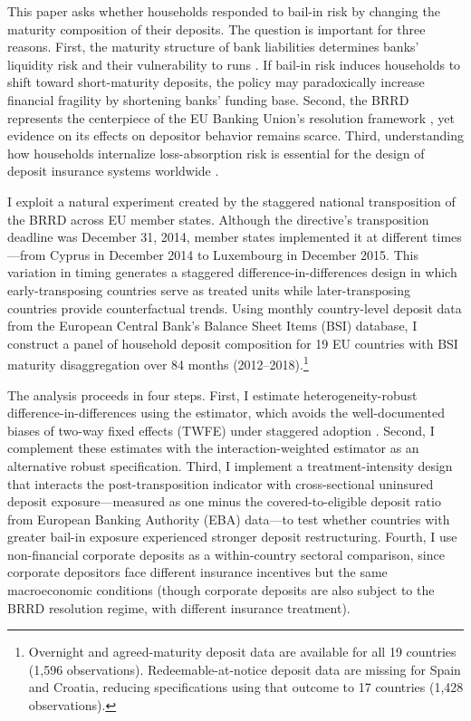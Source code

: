 \documentclass[12pt]{article}
\begin{document}
This paper asks whether households responded to bail-in risk by changing the maturity composition of their deposits. The question is important for three reasons. First, the maturity structure of bank liabilities determines banks' liquidity risk and their vulnerability to runs \citep{diamond1983bank, kashyap2002banks}. If bail-in risk induces households to shift toward short-maturity deposits, the policy may paradoxically increase financial fragility by shortening banks' funding base. Second, the BRRD represents the centerpiece of the EU Banking Union's resolution framework \citep{veron2015europe}, yet evidence on its effects on depositor behavior remains scarce. Third, understanding how households internalize loss-absorption risk is essential for the design of deposit insurance systems worldwide \citep{demirguc2004deposit}.

I exploit a natural experiment created by the staggered national transposition of the BRRD across EU member states. Although the directive's transposition deadline was December 31, 2014, member states implemented it at different times---from Cyprus in December 2014 to Luxembourg in December 2015. This variation in timing generates a staggered difference-in-differences design in which early-transposing countries serve as treated units while later-transposing countries provide counterfactual trends. Using monthly country-level deposit data from the European Central Bank's Balance Sheet Items (BSI) database, I construct a panel of household deposit composition for 19 EU countries with BSI maturity disaggregation over 84 months (2012--2018).\footnote{Overnight and agreed-maturity deposit data are available for all 19 countries (1,596 observations). Redeemable-at-notice deposit data are missing for Spain and Croatia, reducing specifications using that outcome to 17 countries (1,428 observations).}

The analysis proceeds in four steps. First, I estimate heterogeneity-robust difference-in-differences using the \citet{callaway2021difference} estimator, which avoids the well-documented biases of two-way fixed effects (TWFE) under staggered adoption \citep{goodman2021difference}. Second, I complement these estimates with the \citet{sunab2021estimating} interaction-weighted estimator as an alternative robust specification. Third, I implement a treatment-intensity design that interacts the post-transposition indicator with cross-sectional uninsured deposit exposure---measured as one minus the covered-to-eligible deposit ratio from European Banking Authority (EBA) data---to test whether countries with greater bail-in exposure experienced stronger deposit restructuring. Fourth, I use non-financial corporate deposits as a within-country sectoral comparison, since corporate depositors face different insurance incentives but the same macroeconomic conditions (though corporate deposits are also subject to the BRRD resolution regime, with different insurance treatment).
\end{document}
